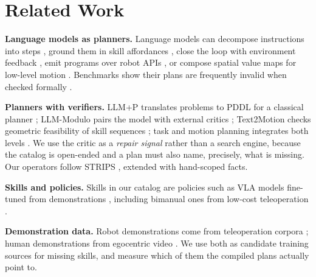 \documentclass[10pt,twocolumn,letterpaper]{article}
\begin{document}
\section{Related Work}
\textbf{Language models as planners.} Language models can decompose instructions
into steps \cite{huang2022zeroshot}, ground them in skill affordances
\cite{ahn2022saycan}, close the loop with environment feedback
\cite{huang2022inner}, emit programs over robot APIs
\cite{liang2023code,singh2023progprompt}, or compose spatial value maps for
low-level motion \cite{huang2023voxposer}. Benchmarks show their plans are
frequently invalid when checked formally \cite{valmeekam2023planbench}.

\textbf{Planners with verifiers.} LLM+P translates problems to PDDL
\cite{mcdermott1998pddl} for a classical planner \cite{liu2023llmp}; LLM-Modulo
pairs the model with external critics \cite{kambhampati2024llmmodulo}; Text2Motion
checks geometric feasibility of skill sequences \cite{lin2023text2motion}; task and
motion planning integrates both levels \cite{garrett2021tamp}. We use the critic as
a \emph{repair signal} rather than a search engine, because the catalog is
open-ended and a plan must also name, precisely, what is missing. Our operators
follow STRIPS \cite{fikes1971strips}, extended with hand-scoped facts.

\textbf{Skills and policies.} Skills in our catalog are policies such as VLA models
fine-tuned from demonstrations \cite{brohan2023rt2,kim2024openvla,octo2024,black2024pi0},
including bimanual ones from low-cost teleoperation \cite{zhao2023aloha}.

\textbf{Demonstration data.} Robot demonstrations come from teleoperation corpora
\cite{oxe2024,khazatsky2024droid,cadene2024lerobot}; human demonstrations from
egocentric video \cite{grauman2022ego4d,damen2022epic,grauman2024egoexo,hoque2025egodex}.
We use both as candidate training sources for missing skills, and measure which of
them the compiled plans actually point to.
\end{document}
